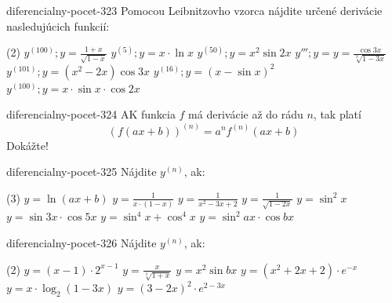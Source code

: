 \begin{defproblem}{diferencialny-pocet-323}
Pomocou Leibnitzovho vzorca nájdite určené derivácie nasledujúcich funkcií:
\begin{tasks}(2)
\task $y^{(100)}; y=\frac{1+x}{\sqrt{1-x}}$
\task $y^{(5)}; y=x\cdot\ln x$
\task $y^{(50)}; y=x^2\sin 2x$
\task $y'''; y=y=\frac{\cos 3x}{\sqrt[3]{1-3x}}$
\task $y^{(101)}; y=(x^2-2x)\cos 3x$
\task $y^{(16)}; y=(x-\sin x)^2$
\task $y^{(100)}; y=x\cdot\sin x\cdot\cos 2x$
\end{tasks}
\end{defproblem}

\begin{defproblem}{diferencialny-pocet-324}
AK funkcia $f$ má derivácie až do rádu $n$, tak platí
\[
  (f(ax+b))^{(n)}=a^nf^{(n)}(ax+b)
\]
Dokážte!
\end{defproblem}

\begin{defproblem}{diferencialny-pocet-325}
Nájdite $y^{(n)}$, ak:
\begin{tasks}(3)
  \task $y=\ln (ax+b)$
  \task $y=\frac{1}{x\cdot(1-x)}$
  \task $y=\frac{1}{x^2-3x+2}$
  \task $y=\frac{1}{\sqrt{1-2x}}$
  \task $y=\sin^2 x$
  \task $y=\sin3x \cdot \cos 5x$
  \task $y=\sin^4 x+\cos^4 x$
  \task $y=\sin^2 ax \cdot \cos bx$
\end{tasks}
\end{defproblem}

\begin{defproblem}{diferencialny-pocet-326}
Nájdite $y^{(n)}$, ak:
\begin{tasks}(2)
  \task $y=(x-1)\cdot 2^{x-1}$
  \task $y=\frac{x}{\sqrt[3]{1+x}}$
  \task $y=x^2\sin bx$
  \task $y=(x^2+2x+2)\cdot e^{-x}$
  \task $y=x\cdot\log_{2}(1-3x)$
  \task $y=(3-2x)^2\cdot e^{2-3x}$
\end{tasks}
\end{defproblem}

